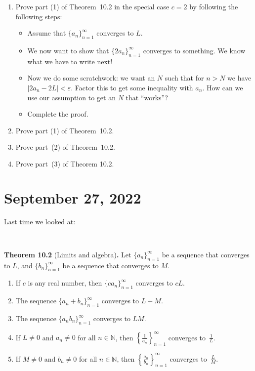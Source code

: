 \documentclass[12pt]{amsart}
\def\e{\varepsilon}
\newcommand{\N}{\mathbb{N}}
\numberwithin{equation}{section}
\theoremstyle{plain} %
\newcommand{\Sept}[1]{\section{September #1, 2022}}
\theoremstyle{definition}
\theoremstyle{remark}
\begin{document}
\begin{enumerate}
\item Prove part (1) of Theorem~10.2  in the special case $c=2$ by following the following steps:
\begin{itemize}
\item Assume that $\{a_n \}_{n=1}^\infty$ converges to $L$.
\item We now want to show that $\{ 2 a_n \}_{n=1}^\infty$ converges to something. We know what we have to write next!
\item Now we do some scratchwork: we want an $N$ such that for $n>N$ we have $|2 a_n - 2 L| < \e$. Factor this to get some inequality with $a_n$. How can we use our assumption to get an $N$ that ``works''?
\item Complete the proof.
\end{itemize}




\item Prove part (1) of Theorem~10.2.



\item Prove part~(2) of Theorem~10.2.



\item Prove part~(3) of Theorem 10.2.
\end{enumerate}



\Sept{27}

Last time we looked at:

\


\noindent \textbf{Theorem 10.2} (Limits and algebra)\textbf{.}
Let $\{a_n\}_{n=1}^\infty$ be a sequence that converges to $L$, and $\{b_n\}_{n=1}^\infty$ be a sequence that converges to $M$.
\begin{enumerate}
\item If $c$ is any real number, then $\{ c a_n\}_{n=1}^\infty$ converges to $cL$.
\item The sequence $\{a_n + b_n\}_{n=1}^\infty$ converges to $L+M$.
\item The sequence $\{a_n b_n\}_{n=1}^\infty$ converges to $LM$.
\item If $L\neq 0$ and $a_n\neq 0$ for all $n\in \N$, then $\displaystyle\left\{\frac{1}{a_n}\right\}_{n=1}^\infty$\!\!\! converges to~$\displaystyle \frac{1}{L}$.
\item If $M\neq 0$ and $b_n\neq 0$ for all $n\in \N$, then $\displaystyle\left\{\frac{a_n}{b_n}\right\}_{n=1}^\infty$\!\!\! converges to~$\displaystyle \frac{L}{M}$.
\end{enumerate}
\end{document}
